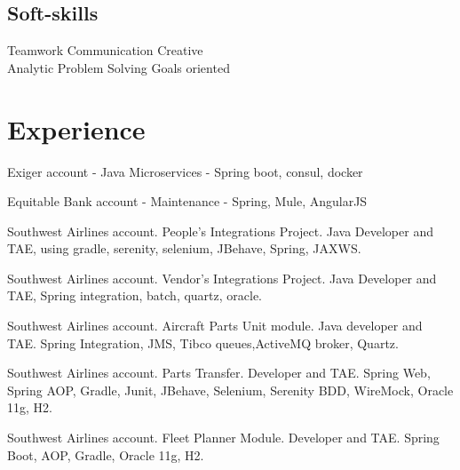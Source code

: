 \documentclass[]{deedy-resume-openfont}
\begin{document}
\begin{minipage}[t]{0.33\textwidth}
\subsection{Soft-skills}
Teamwork \textbullet{} Communication \textbullet{} Creative \\
Analytic \textbullet{} Problem Solving \textbullet{} Goals oriented  \\

\sectionsep

%
%

\end{minipage} 
\hfill
\begin{minipage}[t]{0.66\textwidth} 


\section{Experience}

\vspace{\topsep} %
\begin{tightemize}
\item Exiger account - Java Microservices - Spring boot, consul, docker
\item Equitable Bank account - Maintenance - Spring, Mule, AngularJS
\end{tightemize}
\sectionsep

\begin{tightemize}
\item Southwest Airlines account. People's Integrations Project. Java Developer and TAE, using gradle, serenity, selenium, JBehave, Spring, JAXWS. 
\item Southwest Airlines account. Vendor's Integrations Project. Java Developer and TAE, Spring integration, batch, quartz, oracle.  
\item Southwest Airlines account. Aircraft Parts Unit module. Java developer and TAE. Spring Integration, JMS, Tibco queues,ActiveMQ broker, Quartz.
\item Southwest Airlines account. Parts Transfer. Developer and TAE. Spring Web, Spring AOP, Gradle, Junit, JBehave, Selenium, Serenity BDD, WireMock, Oracle 11g, H2.
\item Southwest Airlines account. Fleet Planner Module. Developer and TAE. Spring Boot, AOP, Gradle, Oracle 11g, H2.\end{tightemize}
\sectionsep


\end{minipage}
\end{document}
